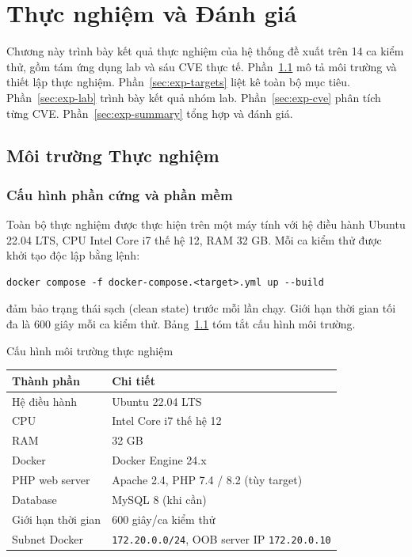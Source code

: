 \chapter{Thực nghiệm và Đánh giá}

Chương này trình bày kết quả thực nghiệm của hệ thống đề xuất trên 14 ca
kiểm thử, gồm tám ứng dụng lab và sáu CVE thực tế.
Phần~\ref{sec:exp-env} mô tả môi trường và thiết lập thực nghiệm.
Phần~\ref{sec:exp-targets} liệt kê toàn bộ mục tiêu.
Phần~\ref{sec:exp-lab} trình bày kết quả nhóm lab.
Phần~\ref{sec:exp-cve} phân tích từng CVE.
Phần~\ref{sec:exp-summary} tổng hợp và đánh giá.

\section{Môi trường Thực nghiệm}
\label{sec:exp-env}

\subsection{Cấu hình phần cứng và phần mềm}

Toàn bộ thực nghiệm được thực hiện trên một máy tính với hệ điều hành
Ubuntu 22.04 LTS, CPU Intel Core i7 thế hệ 12, RAM 32 GB. Mỗi ca kiểm
thử được khởi tạo độc lập bằng lệnh:

\begin{verbatim}
docker compose -f docker-compose.<target>.yml up --build
\end{verbatim}

đảm bảo trạng thái sạch (clean state) trước mỗi lần chạy. Giới hạn
thời gian tối đa là 600 giây mỗi ca kiểm thử. Bảng~\ref{tab:env} tóm
tắt cấu hình môi trường.

\begin{table}[h]{Cấu hình môi trường thực nghiệm}
\label{tab:env}
\centering
\begin{tabular}{|l|l|}
\hline
\textbf{Thành phần} & \textbf{Chi tiết} \\
\hline
Hệ điều hành    & Ubuntu 22.04 LTS \\
CPU             & Intel Core i7 thế hệ 12 \\
RAM             & 32 GB \\
Docker          & Docker Engine 24.x \\
PHP web server  & Apache 2.4, PHP 7.4 / 8.2 (tùy target) \\
Database        & MySQL 8 (khi cần) \\
Giới hạn thời gian & 600 giây/ca kiểm thử \\
Subnet Docker   & \texttt{172.20.0.0/24}, OOB server IP \texttt{172.20.0.10} \\
\hline
\end{tabular}
\end{table}

